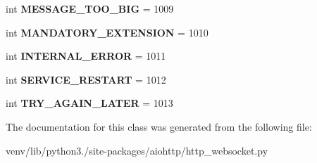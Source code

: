 \begin{DoxyCompactItemize}
\item 
\mbox{\label{classaiohttp_1_1http__websocket_1_1_w_s_close_code_a34959a660e3896657960dddf90383da4}} 
int {\bfseries M\+E\+S\+S\+A\+G\+E\+\_\+\+T\+O\+O\+\_\+\+B\+IG} = 1009
\item 
\mbox{\label{classaiohttp_1_1http__websocket_1_1_w_s_close_code_af4851c91427eb947cf54807776a1c5b9}} 
int {\bfseries M\+A\+N\+D\+A\+T\+O\+R\+Y\+\_\+\+E\+X\+T\+E\+N\+S\+I\+ON} = 1010
\item 
\mbox{\label{classaiohttp_1_1http__websocket_1_1_w_s_close_code_a5783f3f728ea9b90d226bb8fc434774e}} 
int {\bfseries I\+N\+T\+E\+R\+N\+A\+L\+\_\+\+E\+R\+R\+OR} = 1011
\item 
\mbox{\label{classaiohttp_1_1http__websocket_1_1_w_s_close_code_a9883fed22492de8e3b02afccd05d2ef2}} 
int {\bfseries S\+E\+R\+V\+I\+C\+E\+\_\+\+R\+E\+S\+T\+A\+RT} = 1012
\item 
\mbox{\label{classaiohttp_1_1http__websocket_1_1_w_s_close_code_a6be7ee09e2df62a7f2096c5c30a37909}} 
int {\bfseries T\+R\+Y\+\_\+\+A\+G\+A\+I\+N\+\_\+\+L\+A\+T\+ER} = 1013
\end{DoxyCompactItemize}


The documentation for this class was generated from the following file\+:\begin{DoxyCompactItemize}
\item 
venv/lib/python3./site-\/packages/aiohttp/http\+\_\+websocket.\+py\end{DoxyCompactItemize}
